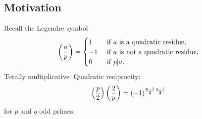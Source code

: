 \documentclass[reqno]{amsart} 
\begin{document}
\subsection{Motivation}
Recall the Legendre symbol
\begin{equation*}
  \left( \frac{a}{p} \right)
  =
  \begin{cases}
    1 & \text{ if $a$ is a quadratic residue}, \\
    -1 & \text{ if $a$ is not a quadratic residue}, \\
    0 & \text{ if $p | a$}.
  \end{cases}  
\end{equation*}
Totally multiplicative.  Quadratic reciprocity:
\begin{equation*}
  \left( \frac{p}{2} \right)
  \left( \frac{2}{p} \right)
  = (-1)^{
    \frac{p-1}{2}
    \frac{q-1}{2}
  }
\end{equation*}
for $p$ and $q$ odd primes.
\end{document}
